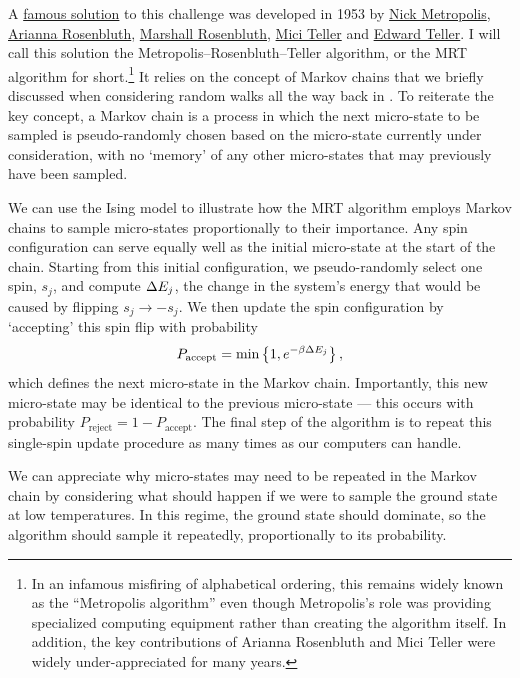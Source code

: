 A \href{https://en.wikipedia.org/wiki/Equation_of_State_Calculations_by_Fast_Computing_Machines}{famous solution} to this challenge was developed in 1953 by \href{https://en.wikipedia.org/wiki/Nicholas_Metropolis}{Nick Metropolis}, \href{https://en.wikipedia.org/wiki/Arianna_W._Rosenbluth}{Arianna Rosenbluth}, \href{https://en.wikipedia.org/wiki/Marshall_Rosenbluth}{Marshall Rosenbluth}, \href{https://en.wikipedia.org/wiki/Augusta_H._Teller}{Mici Teller} and \href{https://en.wikipedia.org/wiki/Edward_Teller}{Edward Teller}.
I will call this solution the Metropolis--Rosenbluth--Teller algorithm, or the MRT algorithm for short.\footnote{In an infamous misfiring of alphabetical ordering, this remains widely known as the ``Metropolis algorithm'' even though Metropolis's role was providing specialized computing equipment rather than creating the algorithm itself.  In addition, the key contributions of Arianna Rosenbluth and Mici Teller were widely under-appreciated for many years.}
It relies on the concept of Markov chains that we briefly discussed when considering random walks all the way back in .
To reiterate the key concept, a Markov chain is a process in which the next micro-state to be sampled is pseudo-randomly chosen based on the micro-state currently under consideration, with no `memory' of any other micro-states that may previously have been sampled.

We can use the Ising model to illustrate how the MRT algorithm employs Markov chains to sample micro-states proportionally to their importance.
Any spin configuration can serve equally well as the initial micro-state at the start of the chain.
Starting from this initial configuration, we pseudo-randomly select one spin, $s_j$, and compute $\Delta E_j$, the change in the system's energy that would be caused by flipping $s_j \to -s_j$.
We then update the spin configuration by `accepting' this spin flip with probability
\begin{equation}
  \label{eq:MRTprob}
  P_{\text{accept}} = \mbox{min}\left\{1, e^{-\beta \Delta E_j}\right\},
\end{equation}
which defines the next micro-state in the Markov chain.
Importantly, this new micro-state may be identical to the previous micro-state --- this occurs with probability $P_{\text{reject}} = 1 - P_{\text{accept}}$.
The final step of the algorithm is to repeat this single-spin update procedure as many times as our computers can handle.

We can appreciate why micro-states may need to be repeated in the Markov chain by considering what should happen if we were to sample the ground state at low temperatures.
In this regime, the ground state should dominate, so the algorithm should sample it repeatedly, proportionally to its probability.

